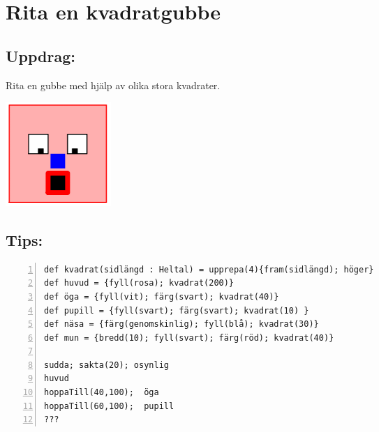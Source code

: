 \chapter{Rita en kvadratgubbe}

\begin{multicols}{2}
\section*{\color{BrickRed}Uppdrag:}
Rita en gubbe med hjälp av olika stora kvadrater.

\columnbreak

\includegraphics[width=4.0cm]{../img/square-man.png}

\end{multicols}

\section*{\color{OliveGreen}Tips:}

\begin{lstlisting}[backgroundcolor=\color{gray!15}, numbers=left,basicstyle={\ttfamily\fontsize{16.0}{16.0}\selectfont}]
def kvadrat(sidlängd : Heltal) = upprepa(4){fram(sidlängd); höger}
def huvud = {fyll(rosa); kvadrat(200)}
def öga = {fyll(vit); färg(svart); kvadrat(40)}
def pupill = {fyll(svart); färg(svart); kvadrat(10) }
def näsa = {färg(genomskinlig); fyll(blå); kvadrat(30)}
def mun = {bredd(10); fyll(svart); färg(röd); kvadrat(40)}

sudda; sakta(20); osynlig
huvud
hoppaTill(40,100);  öga
hoppaTill(60,100);  pupill
???
\end{lstlisting}
        
